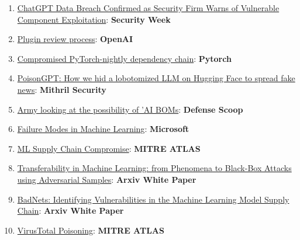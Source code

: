 \documentclass[
]{article}
\providecommand{\tightlist}{%
  \setlength{\itemsep}{0pt}\setlength{\parskip}{0pt}}
\begin{document}
\begin{enumerate}
\def\labelenumi{\arabic{enumi}.}
\tightlist
\item
  \href{https://www.securityweek.com/chatgpt-data-breach-confirmed-as-security-firm-warns-of-vulnerable-component-exploitation/}{ChatGPT
  Data Breach Confirmed as Security Firm Warns of Vulnerable Component
  Exploitation}: \textbf{Security Week}
\item
  \href{https://platform.openai.com/docs/plugins/review}{Plugin review
  process}: \textbf{OpenAI}
\item
  \href{https://pytorch.org/blog/compromised-nightly-dependency/}{Compromised
  PyTorch-nightly dependency chain}: \textbf{Pytorch}
\item
  \href{https://blog.mithrilsecurity.io/poisongpt-how-we-hid-a-lobotomized-llm-on-hugging-face-to-spread-fake-news/}{PoisonGPT:
  How we hid a lobotomized LLM on Hugging Face to spread fake news}:
  \textbf{Mithril Security}
\item
  \href{https://defensescoop.com/2023/05/25/army-looking-at-the-possibility-of-ai-boms-bill-of-materials/}{Army
  looking at the possibility of 'AI BOMs}: \textbf{Defense Scoop}
\item
  \href{https://learn.microsoft.com/en-us/security/engineering/failure-modes-in-machine-learning}{Failure
  Modes in Machine Learning}: \textbf{Microsoft}
\item
  \href{https://atlas.mitre.org/techniques/AML.T0010/}{ML Supply Chain
  Compromise}: \textbf{MITRE ATLAS}
\item
  \href{https://arxiv.org/pdf/1605.07277.pdf}{Transferability in Machine
  Learning: from Phenomena to Black-Box Attacks using Adversarial
  Samples}: \textbf{Arxiv White Paper}
\item
  \href{https://arxiv.org/abs/1708.06733}{BadNets: Identifying
  Vulnerabilities in the Machine Learning Model Supply Chain}:
  \textbf{Arxiv White Paper}
\item
  \href{https://atlas.mitre.org/studies/AML.CS0002}{VirusTotal
  Poisoning}: \textbf{MITRE ATLAS}
\end{enumerate}
\end{document}
